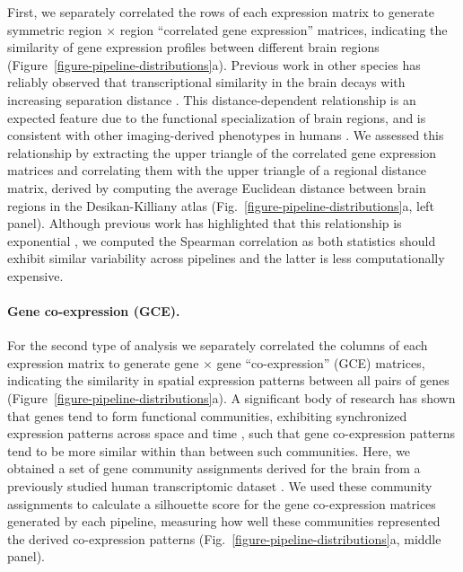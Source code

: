\documentclass[12pt,aps,pra,reprint,showkeys]{revtex4-1}
\begin{document}
First, we separately correlated the rows of each expression matrix to generate symmetric region $\times$ region ``correlated gene expression'' matrices, indicating the similarity of gene expression profiles between different brain regions (Figure~\ref{figure-pipeline-distributions}a).
Previous work in other species has reliably observed that transcriptional similarity in the brain decays with increasing separation distance \citep{fulcher2019pnas, lau2021neuroimage}.
This distance-dependent relationship is an expected feature due to the functional specialization of brain regions, and is consistent with other imaging-derived phenotypes in humans \citep{roberts2016neuroimage, goulas2019sciadv, betzel2018pnas, misic2014plosone, shafiei2020elife, horvat2016plosbio}.
We assessed this relationship by extracting the upper triangle of the correlated gene expression matrices and correlating them with the upper triangle of a regional distance matrix, derived by computing the average Euclidean distance between brain regions in the Desikan-Killiany atlas (Fig.~\ref{figure-pipeline-distributions}a, left panel).
Although previous work has highlighted that this relationship is exponential \citep{arnatkeviciute2019neuroimage}, we computed the Spearman correlation as both statistics should exhibit similar variability across pipelines and the latter is less computationally expensive.

\paragraph*{Gene co-expression (GCE).}

For the second type of analysis we separately correlated the columns of each expression matrix to generate gene $\times$ gene ``co-expression'' (GCE) matrices, indicating the similarity in spatial expression patterns between all pairs of genes (Figure~\ref{figure-pipeline-distributions}a).
A significant body of research has shown that genes tend to form functional communities, exhibiting synchronized expression patterns across space and time \citep{oldham2008natneuro}, such that gene co-expression patterns tend to be more similar within than between such communities.
Here, we obtained a set of gene community assignments derived for the brain from a previously studied human transcriptomic dataset \citep{oldham2008natneuro}.
We used these community assignments to calculate a silhouette score \citep{rousseeuw1987silhouette} for the gene co-expression matrices generated by each pipeline, measuring how well these communities represented the derived co-expression patterns (Fig.~\ref{figure-pipeline-distributions}a, middle panel).
\end{document}

